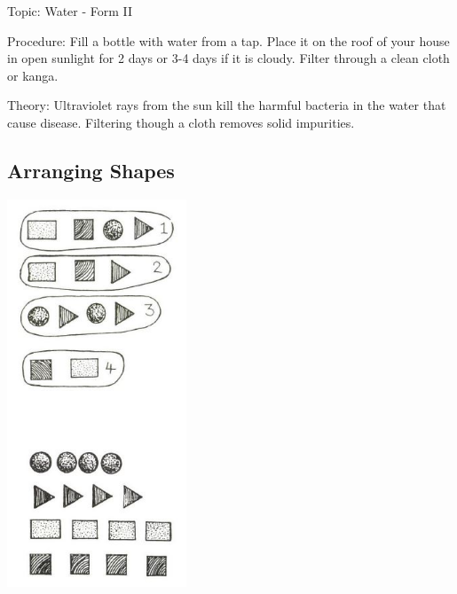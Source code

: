 \begin{multicols}{2}
\begin{description*}
\item[Topic:]{Water - Form II}
\item[Procedure:]{Fill a bottle with water from a tap. Place it on the roof of your house in open sunlight for 2 days or 3-4 days if it is cloudy. Filter through a clean cloth or kanga.}
\item[Theory:]{Ultraviolet rays from the sun kill the harmful bacteria in the water that cause disease. Filtering though a cloth removes solid impurities.}
\end{description*}

\subsection{Arranging Shapes}

\begin{center}
\includegraphics[width=0.4\textwidth]{./img/source/arranging-shapes.jpg}
\end{center}


\end{multicols}
